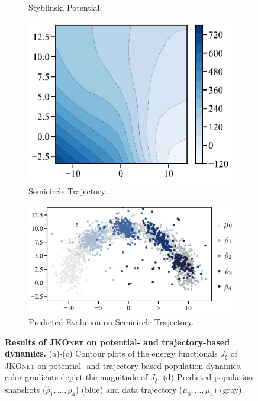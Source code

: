 \begin{figure}[t]
\begin{subfigure}[t]{0.21\textwidth}
         \caption{Styblinski \protect\newline Potential.}
     \end{subfigure}
     \hfill
     \begin{subfigure}[t]{0.22\textwidth}
         \centering
         \includegraphics[width=\textwidth]{figures/fig_energy_implicit_semicircle_tf.pdf}
         \caption{Semicircle \protect\newline Trajectory.}
     \end{subfigure}
     \hfill
     \begin{subfigure}[t]{0.33\textwidth}
         \centering
         \includegraphics[width=\textwidth]{figures/fig_prediction_implicit_semicircle_tf.pdf}
         \caption{Predicted Evolution \protect\newline on Semicircle Trajectory.}
     \end{subfigure}
	 \caption{\textbf{Results of \textsc{JKOnet} on potential- and trajectory-based dynamics.} (a)-(c) Contour plots of the energy functionals $J_\xi$ of \textsc{JKOnet} on potential- and trajectory-based population dynamics, color gradients depict the magnitude of $J_\xi$. (d) Predicted population snapshots ($\hat{\rho}_1, \dots, \hat{\rho}_4$) (blue) and data trajectory ($\mu_0, \dots, \mu_4)$ (gray).}
	 \label{fig:exp_jkonet_pot_traj}
\end{figure}


